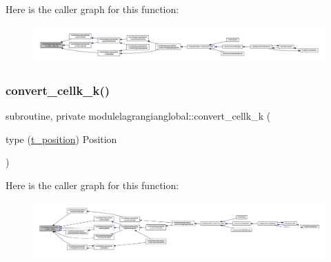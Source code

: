 Here is the caller graph for this function\+:\nopagebreak
\begin{figure}[H]
\begin{center}
\leavevmode
\includegraphics[width=350pt]{namespacemodulelagrangianglobal_a7c1bdff13dafe0f3f6c8cd12a1398401_icgraph}
\end{center}
\end{figure}
\mbox{\label{namespacemodulelagrangianglobal_a75785d33db5dded34e1de495fe447eac}} 
\subsubsection{\texorpdfstring{convert\+\_\+cellk\+\_\+k()}{convert\_cellk\_k()}}
{\footnotesize\ttfamily subroutine, private modulelagrangianglobal\+::convert\+\_\+cellk\+\_\+k (\begin{DoxyParamCaption}\item[{type (\mbox{\hyperlink{structmodulelagrangianglobal_1_1t__position}{t\+\_\+position}})}]{Position }\end{DoxyParamCaption})\hspace{0.3cm}{\ttfamily [private]}}

Here is the caller graph for this function\+:\nopagebreak
\begin{figure}[H]
\begin{center}
\leavevmode
\includegraphics[width=350pt]{namespacemodulelagrangianglobal_a75785d33db5dded34e1de495fe447eac_icgraph}
\end{center}
\end{figure}
\mbox{\label{namespacemodulelagrangianglobal_ab7f2f6590a59e52fd0c30cdc7445acee}} 
